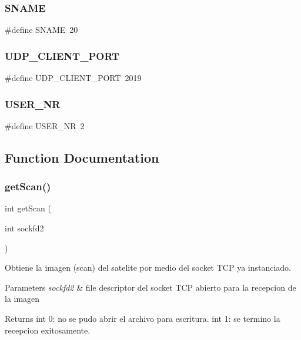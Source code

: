 \subsubsection{SNAME}
{\footnotesize\ttfamily \#define S\+N\+A\+ME~20}

\mbox{\label{server_2main_8c_a3875beebc35d95ef6312fc484bf5adac}} 
\subsubsection{UDP\_CLIENT\_PORT}
{\footnotesize\ttfamily \#define U\+D\+P\+\_\+\+C\+L\+I\+E\+N\+T\+\_\+\+P\+O\+RT~2019}

\mbox{\label{server_2main_8c_ad5b70b0fae15f71d75dfd3110e8ff522}} 
\subsubsection{USER\_NR}
{\footnotesize\ttfamily \#define U\+S\+E\+R\+\_\+\+NR~2}



\subsection{Function Documentation}
\mbox{\label{server_2main_8c_ad0fd16b59ec0ac5a66429c8dad254b8e}} 
\subsubsection{getScan()}
{\footnotesize\ttfamily int get\+Scan (\begin{DoxyParamCaption}\item[{int}]{sockfd2 }\end{DoxyParamCaption})}



Obtiene la imagen (scan) del satelite por medio del socket T\+CP ya instanciado. 


\begin{DoxyParams}{Parameters}
{\em sockfd2} & file descriptor del socket T\+CP abierto para la recepcion de la imagen \\
\hline
\end{DoxyParams}
\begin{DoxyReturn}{Returns}
int 0\+: no se pudo abrir el archivo para escritura. int 1\+: se termino la recepcion exitosamente. 
\end{DoxyReturn}
\mbox{\label{server_2main_8c_ad7764287b17ffb0a84baf8a23275edec}} 
